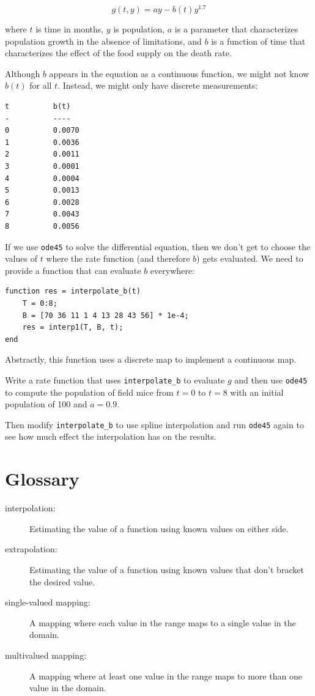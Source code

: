 \documentclass[
]{book}
\begin{document}
\begin{equation}
g(t, y) = ay - b(t) y^{1.7}
\end{equation}

where $t$ is time in months, $y$ is population, $a$ is a parameter
that characterizes population growth in the absence of limitations,
and $b$ is a function of time that characterizes the effect of the
food supply on the death rate.

Although $b$ appears in the equation as a continuous function, we
might not know $b(t)$ for all $t$.  Instead, we might only have discrete
measurements:

\begin{verbatim}
t          b(t)
-          ----
0          0.0070
1          0.0036
2          0.0011
3          0.0001
4          0.0004
5          0.0013
6          0.0028
7          0.0043
8          0.0056
\end{verbatim}

If we use {\tt ode45} to solve the differential equation, then we
don't get to choose the values of $t$ where the rate function
(and therefore $b$) gets evaluated.  We need to provide a function
that can evaluate $b$ everywhere:

\begin{verbatim}
function res = interpolate_b(t)
    T = 0:8;
    B = [70 36 11 1 4 13 28 43 56] * 1e-4;
    res = interp1(T, B, t);
end
\end{verbatim}

Abstractly, this function uses a discrete map to implement a
continuous map.

\begin{ex}
Write a rate function that uses
{\tt interpolate\_b} to evaluate $g$ and then
use {\tt ode45} to compute the population of field mice
from $t=0$ to $t=8$ with an initial population of 100 and
$a=0.9$.

Then modify {\tt interpolate\_b} to use spline interpolation
and run {\tt ode45} again to see how much effect the interpolation
has on the results.
\end{ex}

\section{Glossary}

\begin{description}

\item[interpolation:] Estimating the value of a function using
known values on either side.

\item[extrapolation:] Estimating the value of a function using
known values that don't bracket the desired value.

\item[single-valued mapping:] A mapping where each value in the
range maps to a single value in the domain.

\item[multivalued mapping:] A mapping where at least one value in
the range maps to more than one value in the domain.

\end{description}
\end{document}

